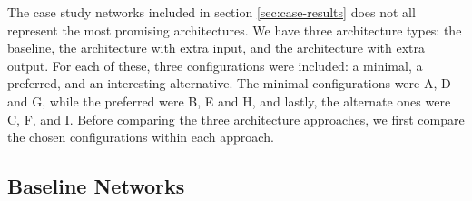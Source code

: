 \begin{comment}
RQ 2: How can facial expression data be utilized to improve a face recognition system?

RO 2.1:Investigate what happens when incorporating expression data in a face recognition system.

order of performance, from best to worst: E, F, B, D, C, A, H, G, I
avvik i orden: test acc. er litt høyere i C enn D
avvik i orden: test og val. loss er litt lavere i A enn C
avvik i orden: test og val. loss er litt lavere i I enn G
avvik i orden: test ID acc. er litt høyere i I enn G
avvik i orden: test og val. exp. acc. er litt høyere i I enn G
avvik i orden: test og val. exp. loss er litt lavere i I enn G
avvik i orden: I har faktisk høyest exp. test acc.

for extra output: loss is high, but accuracy isnt THAT bad

The combined metrics of the extra output architecture make it harder to compare to the baseline and extra input architecture.

The extra output architecture underperforms in comparison with the other two, but still manages an impressive accuracy considering it is tackling two problems simultaneously.

comment on separated performance metrics for extra output networks
\end{comment}

The case study networks included in section \ref{sec:case-results} does not all represent the most promising architectures. We have three architecture types: the baseline, the architecture with extra input, and the architecture with extra output. For each of these, three configurations were included: a minimal, a preferred, and an interesting alternative. The minimal configurations were A, D and G, while the preferred were B, E and H, and lastly, the alternate ones were C, F, and I. Before comparing the three architecture approaches, we first compare the chosen configurations within each approach.

\subsection{Baseline Networks}

